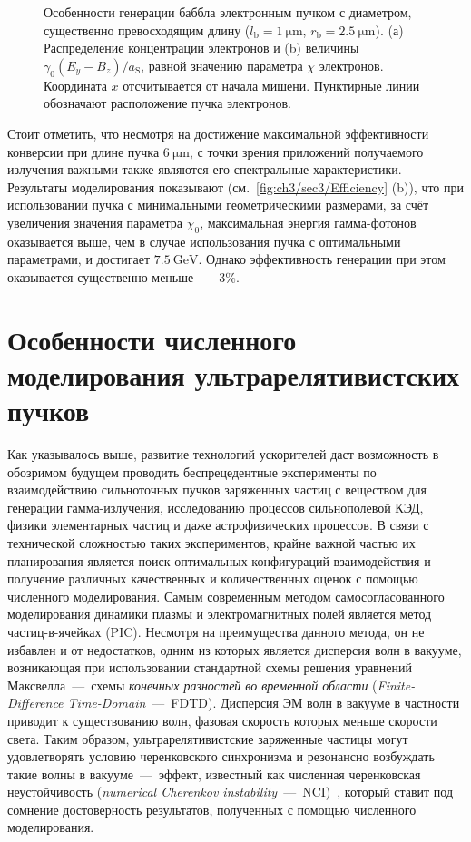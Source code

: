 \begin{figure}[ht]
    \caption[Особенности генерации баббла электронным пучком с диаметром, существенно превосходящим длину]{Особенности генерации баббла электронным пучком с диаметром, существенно превосходящим длину ($l_\mathrm{b} = \SI{1}{\um}$, $r_\mathrm{b} = \SI{2.5}{\um}$). (а) Распределение концентрации электронов и (b) величины $\gamma_0 \left( E_y - B_z \right) / a_\mathrm{S}$, равной значению параметра $\chi$ электронов.
    Координата $x$ отсчитывается от начала мишени.
    Пунктирные линии обозначают расположение пучка электронов.}
    \label{fig:ch3/sec3/Pancake}
\end{figure}

Стоит отметить, что несмотря на достижение максимальной эффективности конверсии при длине пучка $\SI{6}{\um}$, с точки зрения приложений получаемого излучения важными также являются его спектральные характеристики.
Результаты моделирования показывают (см.~\ref{fig:ch3/sec3/Efficiency} (b)), что при использовании пучка с минимальными геометрическими размерами, за счёт увеличения значения параметра $\chi_0$, максимальная энергия гамма-фотонов оказывается выше, чем в случае использования пучка с оптимальными параметрами, и достигает $\SI{7.5}{\giga\electronvolt}$.
Однако эффективность генерации при этом оказывается существенно меньше~---~3\%.

\section{Особенности численного моделирования ультрарелятивистских пучков}
\label{sec:ch3/sec4}

Как указывалось выше, развитие технологий ускорителей даст возможность в обозримом будущем проводить беспрецедентные эксперименты по взаимодействию сильноточных пучков заряженных частиц с веществом для генерации гамма-излучения, исследованию процессов сильнополевой КЭД, физики элементарных частиц и даже астрофизических процессов.
В связи с технической сложностью таких экспериментов, крайне важной частью их планирования является поиск оптимальных конфигураций взаимодействия и получение различных качественных и количественных оценок с помощью численного моделирования.
Самым современным методом самосогласованного моделирования динамики плазмы и электромагнитных полей является метод частиц-в-ячейках (PIC).
Несмотря на преимущества данного метода, он не избавлен и от недостатков, одним из которых является дисперсия волн в вакууме, возникающая при использовании стандартной схемы решения уравнений Максвелла~---~схемы \textit{конечных разностей во временной области} (\textit{Finite-Difference Time-Domain}~---~FDTD).
Дисперсия ЭМ волн в вакууме в частности приводит к существованию волн, фазовая скорость которых меньше скорости света.
Таким образом, ультрарелятивистские заряженные частицы могут удовлетворять условию черенковского синхронизма и резонансно возбуждать такие волны в вакууме~---~эффект, известный как {численная черенковская неустойчивость} (\textit{numerical Cherenkov instability}~---~NCI)~\cite{Birdsall1989, Meyers2014, Blinne2017}, который ставит под сомнение достоверность результатов, полученных с помощью численного моделирования.

